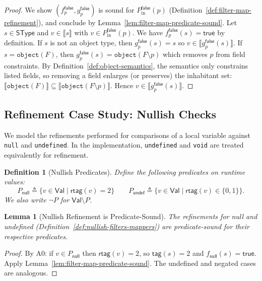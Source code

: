 \documentclass[11pt]{article}
\newtheorem{lemma}[theorem]{Lemma}
\newtheorem{definition}[theorem]{Definition}
\newcommand{\sem}[1]{\llbracket #1 \rrbracket}
\newcommand{\SType}{\mathsf{SType}}
\newcommand{\tagfn}{\mathsf{tag}}
\newcommand{\rtag}{\mathsf{rtag}}
\newcommand{\Val}{\mathsf{Val}}
\begin{document}
\begin{proof}
We show $(f^{\mathsf{false}}_p,g^{\mathsf{false}}_p)$ is sound for $P_{\mathrm{in}}^{\mathsf{false}}(p)$ (Definition~\ref{def:filter-map-refinement}), and conclude by Lemma~\ref{lem:filter-map-predicate-sound}.
Let $s \in \SType$ and $v \in \sem{s}$ with $v \in P_{\mathrm{in}}^{\mathsf{false}}(p)$.
We have $f^{\mathsf{false}}_p(s)=\mathsf{true}$ by definition.
If $s$ is not an object type, then $g^{\mathsf{false}}_p(s)=s$ so $v \in \sem{g^{\mathsf{false}}_p(s)}$.
If $s=\texttt{object}(F)$, then $g^{\mathsf{false}}_p(s)=\texttt{object}(F\setminus p)$ which removes $p$ from field constraints.
By Definition~\ref{def:object-semantics}, the semantics only constrains listed fields, so removing a field enlarges (or preserves) the inhabitant set: $\sem{\texttt{object}(F)} \subseteq \sem{\texttt{object}(F\setminus p)}$.
Hence $v \in \sem{g^{\mathsf{false}}_p(s)}$.
\end{proof}

\subsection{Refinement Case Study: Nullish Checks}

We model the refinements performed for comparisons of a local variable against \texttt{null} and \texttt{undefined}.
In the implementation, \texttt{undefined} and \texttt{void} are treated equivalently for refinement.

\begin{definition}[Nullish Predicates]
\label{def:nullish-predicates}
Define the following predicates on runtime values:
\[
P_{\mathsf{null}} \triangleq \{ v \in \Val \mid \rtag(v)=2 \}
\qquad
P_{\mathsf{undef}} \triangleq \{ v \in \Val \mid \rtag(v)\in\{0,1\} \}.
\]
We also write $\neg P$ for $\Val \setminus P$.
\end{definition}

\begin{lemma}[Nullish Refinement is Predicate-Sound]
\label{lem:null-refine-predicate-sound}
\label{lem:undef-refine-predicate-sound}
The refinements for null and undefined (Definition~\ref{def:nullish-filters-mappers}) are predicate-sound for their respective predicates.
\end{lemma}

\begin{proof}
By A0: if $v \in P_{\mathsf{null}}$ then $\rtag(v)=2$, so $\tagfn(s)=2$ and $f_{\mathsf{null}}(s)=\mathsf{true}$.
Apply Lemma~\ref{lem:filter-map-predicate-sound}. The undefined and negated cases are analogous.
\end{proof}
\end{document}
